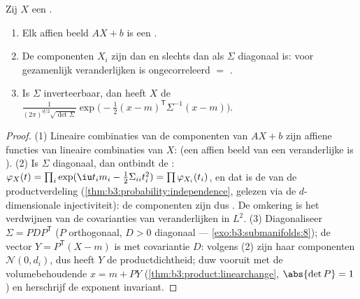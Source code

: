 \begin{theorem}\label{thm:b3:clt:gaussianvector}
Zij $X$ een .
\begin{enumerate}
  \item Elk affien beeld $AX + b$ is een .
  \item De componenten $X_i$ zijn \emph{} dan en
        slechts dan als $\Sigma$ diagonaal is: voor gezamenlijk
         veranderlijken is ongecorreleerd $=$
        .
  \item Is $\Sigma$ inverteerbaar, dan heeft $X$ de 
        $\frac{1}{(2\pi)^{d/2}\sqrt{\det\Sigma}}
        \exp\bigl(-\frac12(x - m)^{\mathsf T}\Sigma^{-1}(x -
        m)\bigr)$.
\end{enumerate}
\end{theorem}

\begin{proof}
(1) Lineaire combinaties van de componenten van $AX + b$ zijn
affiene functies van lineaire combinaties van $X$:  (een
affien beeld van een  veranderlijke is ).
(2) Is $\Sigma$ diagonaal, dan ontbindt de : $\varphi_X(t) = \prod_i\exp(\iu t_im_i -
\frac12\Sigma_{ii}t_i^2) = \prod\varphi_{X_i}(t_i)$, en dat is de
 van de productverdeling
(\cref{thm:b3:probability:independence}, gelezen via de
$d$-dimensionale injectiviteit): de componenten zijn dus
. De omkering is het verdwijnen van de covarianties
van  veranderlijken in $L^2$.
(3) Diagonaliseer $\Sigma = P D P^{\mathsf T}$ ($P$ orthogonaal,
$D > 0$ diagonaal --- \cref{exo:b3:submanifolds:8}); de vector $Y
= P^{\mathsf T}(X - m)$ is  met covariantie $D$: volgens
(2) zijn haar componenten  $\mathcal N(0, d_i)$, dus
heeft $Y$ de productdichtheid; duw vooruit met de
volumebehoudende $x = m + PY$
(\cref{thm:b3:product:linearchange}, $\abs{\det P} = 1$) en
herschrijf de exponent invariant.
\end{proof}

